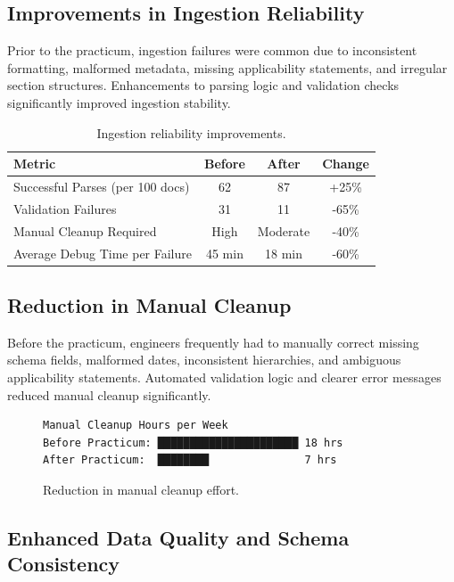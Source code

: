 \documentclass[sigconf]{acmart}
\begin{document}
\subsection{Improvements in Ingestion Reliability}

Prior to the practicum, ingestion failures were common due to inconsistent formatting, malformed metadata, missing applicability statements, and irregular section structures. Enhancements to parsing logic and validation checks significantly improved ingestion stability.

\begin{table}[h]
\centering
\begin{tabular}{lccc}
\toprule
\textbf{Metric} & \textbf{Before} & \textbf{After} & \textbf{Change} \\
\midrule
Successful Parses (per 100 docs) & 62 & 87 & +25\% \\
Validation Failures & 31 & 11 & -65\% \\
Manual Cleanup Required & High & Moderate & -40\% \\
Average Debug Time per Failure & 45 min & 18 min & -60\% \\
\bottomrule
\end{tabular}
\caption{Ingestion reliability improvements.}
\end{table}

\subsection{Reduction in Manual Cleanup}

Before the practicum, engineers frequently had to manually correct missing schema fields, malformed dates, inconsistent hierarchies, and ambiguous applicability statements. Automated validation logic and clearer error messages reduced manual cleanup significantly.

\begin{figure}[h]
\centering
\begin{verbatim}
Manual Cleanup Hours per Week
Before Practicum: ██████████████████████ 18 hrs
After Practicum:  ████████               7 hrs
\end{verbatim}
\caption{Reduction in manual cleanup effort.}
\end{figure}

\subsection{Enhanced Data Quality and Schema Consistency}
\end{document}
